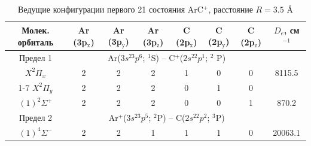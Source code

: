 \documentclass[12pt]{extarticle}
\begin{document}
    \begin{table}[H]
    	\centering
    	\footnotesize
        \caption{\label{tab:configs} Ведущие конфигурации первого 21 состояния ArC$^{+}$, расстояние $R = 3.5$ \AA}
    	\begin{tabular}{|c|cccccc|c|}
    		\hline
    		Молек. орбиталь            & \multicolumn{1}{c|}{Ar (3p$_\text{x}$)} & \multicolumn{1}{c|}{Ar (3p$_\text{y}$)} & \multicolumn{1}{c|}{Ar (3p$_\text{z}$)} & \multicolumn{1}{c|}{C (2p$_\text{x}$)} & \multicolumn{1}{c|}{C (2p$_\text{y}$)} & C (2p$_\text{z}$) & $D_e$, см$^{-1}$ \\ \hline
    		Предел 1                    & \multicolumn{6}{c|}{Ar($3s^23p^6$; $^1$S) -- C$^+$($2s^22p^1$; $^2$ P)}                                                                                                                                                           &                  \\ \hline
    		$X^2\Pi_x$                 & 2                                       & 2                                       & 2                                       & 1                                      & 0                                      & 0                 & 8115.5           \\ \cline{1-7}
    		$X^2\Pi_y$                 & 2                                       & 2                                       & 2                                       & 0                                      & 1                                      & 0                 &                  \\ \hline
    		$(1)^2\Sigma^+$            & 2                                       & 2                                       & 2                                       & 0                                      & 0                                      & 1                 & 870.2            \\ \hline
    		Предел 2                    & \multicolumn{6}{c|}{Ar$^+$($3s^23p^5$; $^2$P) -- C($2s^22p^2$; $^3$P)}                                                                                                                                                            &                  \\ \hline
    		$(1)^4\Sigma^-$            & 2                                       & 2                                       & 1                                       & 1                                      & 1                                      & 0                 & 20063.1          \\ \hline

\end{tabular}
\end{table}
\end{document}
